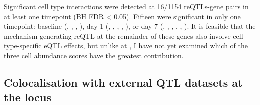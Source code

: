 Significant cell type interactions were detected at \num{16/1154} \glspl{reQTL}-gene pairs in at least one timepoint (\gls{BH} \gls{FDR} < 0.05).
Fifteen were significant in only one timepoint:
baseline (, , , ),
day 1 (, , , , ),
or day 7 (, , , , , ).
It is feasible that the mechanism generating \gls{reQTL} at the remainder of these genes also involve cell type-specific \gls{eQTL} effects, 
but unlike at , 
I have not yet examined which of the three cell abundance scores have the greatest contribution.

%
%
%

\subsection{Colocalisation with external QTL datasets at the  locus}

